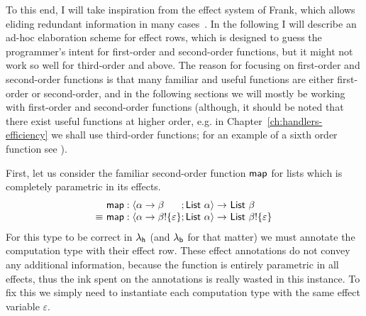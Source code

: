 \documentclass[12pt,phd,lfcs,twoside,openright,logo,leftchapter,normalheadings]{infthesis}
\theoremstyle{plain}
\theoremstyle{definition}
\begin{document}
To this end, I will take inspiration from the effect system of Frank,
which allows eliding redundant information in many
cases~\cite{LindleyMM17}.
%
In the following I will describe an ad-hoc elaboration scheme for
effect rows, which is designed to guess the programmer's intent for
first-order and second-order functions, but it might not work so well for
third-order and above. The reason for focusing on first-order and
second-order functions is that many familiar and useful functions are
either first-order or second-order, and in the following sections we
will mostly be working with first-order and second-order functions
(although, it should be noted that there exist useful functions at
higher order, e.g. in Chapter~\ref{ch:handlers-efficiency} we shall
use third-order functions; for an example of a sixth order function
see \citet{Okasaki98}).

First, let us consider the familiar second-order function $\mathsf{map}$ for
lists which is completely parametric in its effects.
%
\[
  \ba{@{~}l@{~}l@{}l@{~}l}
        &\map : \Record{\alpha \to \beta &;\List~\alpha} \to &\List~\beta\\
  \equiv&\map : \Record{\alpha \to \beta \eff \{\varepsilon\}&;\List~\alpha}
          \to &\List~\beta \eff \{\varepsilon\}
  \ea
\]
%
For this type to be correct in $\lambda_{\mathsf{h}}$ (and $\lambda_{\mathsf{b}}$ for that matter)
we must annotate the computation type with their effect row.
%
These effect annotations do not convey any additional information,
because the function is entirely parametric in all effects, thus the
ink spent on the annotations is really wasted in this instance.
%
To fix this we simply need to instantiate each computation type with
the same effect variable $\varepsilon$.
\end{document}
